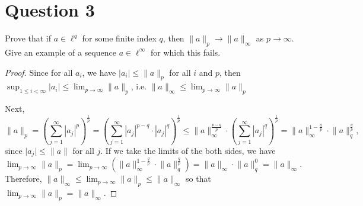 \section{Question 3}

\begin{question}
    Prove that if $a \in \ell^q$ for some finite index $q$, then $\|a\|_p \rightarrow\|a\|_{\infty}$ as $p \rightarrow \infty$. Give an example of a sequence $a \in \ell^{\infty}$ for which this fails.
\end{question}

\begin{answer}
    \begin{proof}
        Since for all $a_i$, we have $\lvert a_i \rvert \leq \lVert a \rVert_p$ for all $i$ and $p$, then $\sup_{1 \leq i < \infty}{\lvert a_i \rvert} \leq \lim_{p \to \infty}{\lVert a \rVert_p}$, i.e. $\lVert a \rVert_{\infty} \leq \lim_{p \to \infty}{\lVert a \rVert_p}$
        
        Next,
        \begin{equation}
            \lVert a \rVert_p = \left(\sum_{j=1}^{\infty}\left\lvert a_j\right\rvert^{p}\right)^{\frac{1}{p}} = \left(\sum_{j=1}^{\infty}\left\lvert a_j\right\rvert^{p-q} \cdot\left\lvert a_j\right\rvert^q\right)^{\frac{1}{p}} \leq\lVert a\rVert_{\infty}^{\frac{p-q}{p}} \cdot\left(\sum_{j=1}^{\infty}\left\lvert a_j\right\rvert^q\right)^{\frac{1}{p}}=\lVert a\rVert_{\infty}^{1-\frac{q}{p}} \cdot\lVert a\rVert_q^{\frac{q}{p}},
        \end{equation}
        since $\lvert a_j \rvert \leq \lVert a \rVert$ for all $j$. If we take the limits of the both sides, we have $\lim_{p \to \infty}{\lVert a \rVert_p} = \lim_{p \to \infty}{\left(\lVert a\rVert_{\infty}^{1-\frac{q}{p}} \cdot\lVert a\rVert_q^{\frac{q}{p}}\right)} = {\lVert a \rVert_{\infty}\cdot \lVert a \rVert_q^0} = \lVert a \rVert_{\infty}$. Therefore, $\lVert a \rVert_{\infty} \leq \lim_{p \to \infty}{\lVert a \rVert_p} \leq \lVert a \rVert_{\infty}$ so that $\lim_{p \to \infty}{\lVert a \rVert_p} = \lVert a \rVert_{\infty}$.
    \end{proof}
\end{answer}